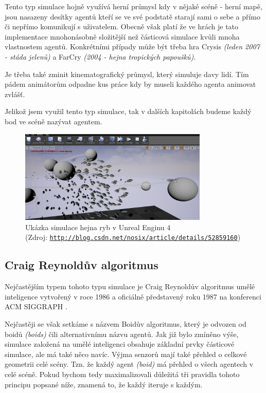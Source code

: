 \documentclass[czech,public,dept460,male,cpdeclaration]{diploma}
\begin{document}
Tento typ simulace hojně využívá herní průmysl kdy v nějaké scéně - herní mapě, jsou nasazeny desítky agentů kteří se ve své podstatě starají sami o sebe a přímo či nepřímo komunikují s uživatelem. Obecně však platí že ve hrách je tato implementace mnohonásobně složitější než částicová simulace kvůli mnoha vlastnostem agentů. Konkrétními případy může být třeba hra Crysis \textit{(leden 2007 - stáda jelenů)} a FarCry \textit{(2004 - hejna tropických papoušků)}.

Je třeba také zminit kinematografický průmysl, který simuluje davy lidí. Tím pádem animátorům odpadne kus práce kdy by museli každého agenta animovat zvlášť.

Jelikož jsem využil tento typ simulace, tak v dalších kapitolách budeme každý bod ve scéně nazývat agentem.

\begin{figure}\centering\includegraphics[width=0.8\textwidth]{Figures/flock_fish.png}
	\caption{
		Ukázka simulace hejna ryb v Unreal Enginu 4\\\hspace{\textwidth}(Zdroj: 
		\href{http://blog.csdn.net/nosix/article/details/52859160}{\texttt{http://blog.csdn.net/nosix/article/details/52859160}})
	}
\end{figure}

\subsection{Craig Reynoldův algoritmus}

Nejčastějším typem tohoto typu simulace je Craig Reynoldův algoritmus umělé inteligence vytvořený v roce 1986 a oficiálně představený roku 1987 na konferenci ACM SIGGRAPH \cite{linkToACM, linkToSIGGRAPH}.

Nejčastěji se však setkáme s názvem Boidův algoritmus, který je odvozen od boidů \textit{(boids)} čili alternativnímu názvu agentů. Jak již bylo zmíněno výše, simulace založená na
umělé inteligenci obsahuje základní prvky částicové simulace, ale má také něco navíc. Výjma senzorů mají také přehled o celkové geometrii celé scény. Tzn. že každý agent \textit{(boid)} má přehled o všech agentech v celé scéně. Pokud bychom tedy maximalizovali důležitá tři pravidla tohoto principu popsané níže, znamená to, že každý iteruje \cite{linkToIteration} s každým.
\end{document}

